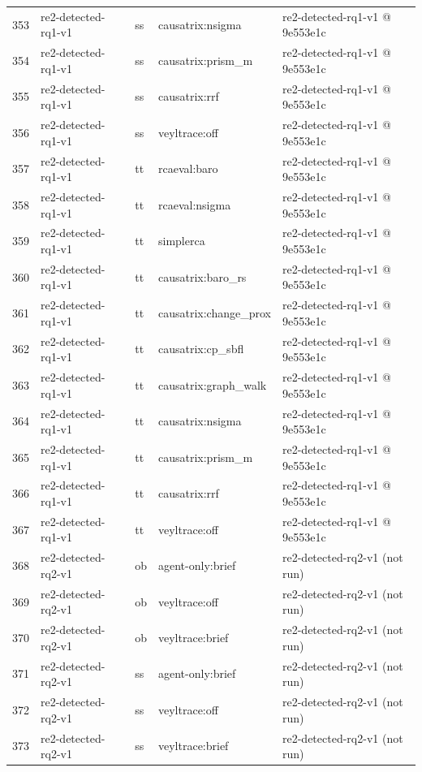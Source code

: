 \begin{longtable}{@{}r>{\raggedright\arraybackslash}p{87.0pt}>{\raggedright\arraybackslash}p{18.0pt}>{\raggedright\arraybackslash}p{63.0pt}>{\raggedright\arraybackslash}p{108.0pt}@{}}
353 & re2-detected-rq1-v1 & ss & causatrix:nsigma & re2-detected-rq1-v1 @ 9e553e1c \\
354 & re2-detected-rq1-v1 & ss & causatrix:prism\_m & re2-detected-rq1-v1 @ 9e553e1c \\
355 & re2-detected-rq1-v1 & ss & causatrix:rrf & re2-detected-rq1-v1 @ 9e553e1c \\
356 & re2-detected-rq1-v1 & ss & veyltrace:off & re2-detected-rq1-v1 @ 9e553e1c \\
357 & re2-detected-rq1-v1 & tt & rcaeval:baro & re2-detected-rq1-v1 @ 9e553e1c \\
358 & re2-detected-rq1-v1 & tt & rcaeval:nsigma & re2-detected-rq1-v1 @ 9e553e1c \\
359 & re2-detected-rq1-v1 & tt & simplerca & re2-detected-rq1-v1 @ 9e553e1c \\
360 & re2-detected-rq1-v1 & tt & causatrix:baro\_rs & re2-detected-rq1-v1 @ 9e553e1c \\
361 & re2-detected-rq1-v1 & tt & causatrix:change\_prox & re2-detected-rq1-v1 @ 9e553e1c \\
362 & re2-detected-rq1-v1 & tt & causatrix:cp\_sbfl & re2-detected-rq1-v1 @ 9e553e1c \\
363 & re2-detected-rq1-v1 & tt & causatrix:graph\_walk & re2-detected-rq1-v1 @ 9e553e1c \\
364 & re2-detected-rq1-v1 & tt & causatrix:nsigma & re2-detected-rq1-v1 @ 9e553e1c \\
365 & re2-detected-rq1-v1 & tt & causatrix:prism\_m & re2-detected-rq1-v1 @ 9e553e1c \\
366 & re2-detected-rq1-v1 & tt & causatrix:rrf & re2-detected-rq1-v1 @ 9e553e1c \\
367 & re2-detected-rq1-v1 & tt & veyltrace:off & re2-detected-rq1-v1 @ 9e553e1c \\
368 & re2-detected-rq2-v1 & ob & agent-only:brief & re2-detected-rq2-v1 (not run) \\
369 & re2-detected-rq2-v1 & ob & veyltrace:off & re2-detected-rq2-v1 (not run) \\
370 & re2-detected-rq2-v1 & ob & veyltrace:brief & re2-detected-rq2-v1 (not run) \\
371 & re2-detected-rq2-v1 & ss & agent-only:brief & re2-detected-rq2-v1 (not run) \\
372 & re2-detected-rq2-v1 & ss & veyltrace:off & re2-detected-rq2-v1 (not run) \\
373 & re2-detected-rq2-v1 & ss & veyltrace:brief & re2-detected-rq2-v1 (not run) \\

\end{longtable}
